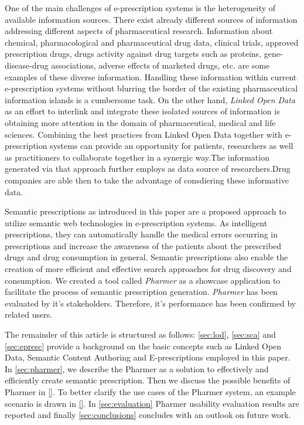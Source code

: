 \documentclass[10pt, conference, compsocconf]{IEEEtran}
\begin{document}
One of the main challenges of e-prescription systems is the heterogeneity of available information sources.
There exist already different sources of information addressing different aspects of pharmaceutical research.
Information about chemical, pharmacological and pharmaceutical drug data, clinical trials, approved prescription drugs, drugs activity against drug targets such as proteins, gene-disease-drug associations, adverse effects of marketed drugs, etc. are some examples of these diverse information.
Handling these information within current e-prescription systems without blurring the border of the existing pharmaceutical information islands is a cumbersome task.
On the other hand, \emph{Linked Open Data} as an effort to interlink and integrate these isolated sources of information is obtaining more attention in the domain of pharmaceutical, medical and life sciences.
Combining the best practices from Linked Open Data together with e-prescription systems can provide an opportunity for patients, researchers as well as practitioners to collaborate together in a synergic way.The information generated via that approach further employs as data source of researchers.Drug companies are able then to take the advantage of consdiering these informative data.

Semantic prescriptions as introduced in this paper are a proposed approach to utilize semantic web technologies in e-prescription systems.
As intelligent prescriptions, they can automatically handle the medical errors occurring in prescriptions and increase the awareness of the patients about the prescribed drugs and drug consumption in general.
Semantic prescriptions also enable the creation of more efficient and effective search approaches for drug discovery and consumption.
We created a tool called \emph{Pharmer} as a showcase application to facilitate the process of semantic prescription generation.
\emph{Pharmer} has been evaluated by it's stakeholders. Therefore, it's performance has been confirmed by related users.

The remainder of this article is structured as follows:
\autoref{sec:lod}, \autoref{sec:sca} and \autoref{sec:epresc} provide a background on the basic concepts such as Linked Open Data, Semantic Content Authoring and E-prescriptions employed in this paper.
In \autoref{sec:pharmer}, we describe the Pharmer as a solution to effectively and efficiently create semantic prescription.
Then we discuss the possible benefits of Pharmer in \autoref{}.
To better clarify the use cases of the Pharmer system, an example scenario is drawn in \autoref{}.
In \autoref{sec:evaluation} Pharmer usability evaluation results are reported and finally \ref{sec:conclusions} concludes with an outlook on future work.
\end{document}
